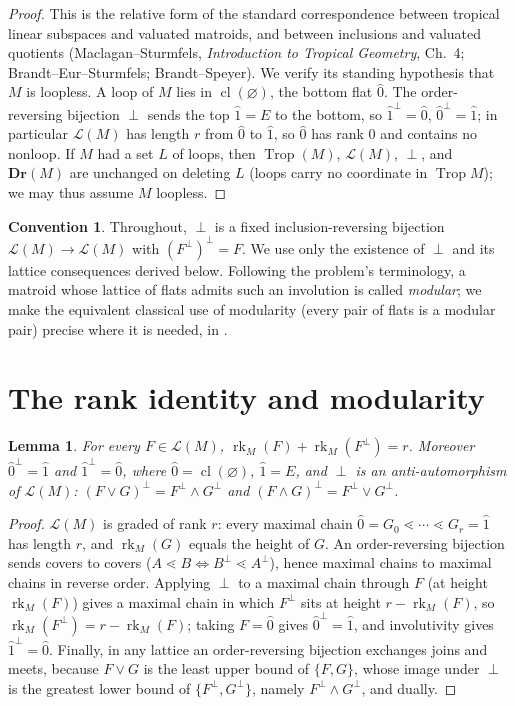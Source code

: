 \documentclass{article}
\newtheorem{lemma}[theorem]{Lemma}
\theoremstyle{definition}
\newtheorem{convention}[theorem]{Convention}
\newcommand{\rk}{\operatorname{rk}}
\newcommand{\cl}{\operatorname{cl}}
\newcommand{\Trop}{\operatorname{Trop}}
\newcommand{\Dr}{\mathbf{Dr}}
\newcommand{\cLL}{\mathcal{L}}
\begin{document}
\begin{proof}
This is the relative form of the standard correspondence between tropical linear subspaces and
valuated matroids, and between inclusions and valuated quotients (Maclagan--Sturmfels,
\emph{Introduction to Tropical Geometry}, Ch.~4; Brandt--Eur--Sturmfels; Brandt--Speyer). We verify
its standing hypothesis that $M$ is loopless. A loop of $M$ lies in $\cl(\varnothing)$, the bottom
flat $\hat0$. The order-reversing bijection $\perp$ sends the top $\hat1=E$ to the bottom, so
$\hat1^{\perp}=\hat0$, $\hat0^{\perp}=\hat1$; in particular $\cLL(M)$ has length $r$ from $\hat0$ to
$\hat1$, so $\hat0$ has rank $0$ and contains no nonloop. If $M$ had a set $L$ of loops, then
$\Trop(M)$, $\cLL(M)$, $\perp$, and $\Dr(M)$ are unchanged on deleting $L$ (loops carry no coordinate
in $\Trop M$); we may thus assume $M$ loopless.
\end{proof}

\begin{convention}\label{conv:perp}
Throughout, $\perp$ is a fixed inclusion-reversing bijection $\cLL(M)\to\cLL(M)$ with
$(F^{\perp})^{\perp}=F$. We use only the existence of $\perp$ and its lattice consequences derived
below. Following the problem's terminology, a matroid whose lattice of flats admits such an
involution is called \emph{modular}; we make the equivalent classical use of modularity (every pair
of flats is a modular pair) precise where it is needed, in .
\end{convention}

\section{The rank identity and modularity}

\begin{lemma}\label{lem:rank}
For every $F\in\cLL(M)$, $\rk_M(F)+\rk_M(F^{\perp})=r$. Moreover $\hat0^{\perp}=\hat1$ and
$\hat1^{\perp}=\hat0$, where $\hat0=\cl(\varnothing)$, $\hat1=E$, and $\perp$ is an anti-automorphism
of $\cLL(M)$: $(F\vee G)^{\perp}=F^{\perp}\wedge G^{\perp}$ and $(F\wedge G)^{\perp}=F^{\perp}\vee
G^{\perp}$.
\end{lemma}

\begin{proof}
$\cLL(M)$ is graded of rank $r$: every maximal chain $\hat0=G_0\lessdot\cdots\lessdot G_r=\hat1$ has
length $r$, and $\rk_M(G)$ equals the height of $G$. An order-reversing bijection sends covers to
covers ($A\lessdot B\iff B^{\perp}\lessdot A^{\perp}$), hence maximal chains to maximal chains in
reverse order. Applying $\perp$ to a maximal chain through $F$ (at height $\rk_M(F)$) gives a maximal
chain in which $F^{\perp}$ sits at height $r-\rk_M(F)$, so $\rk_M(F^{\perp})=r-\rk_M(F)$; taking
$F=\hat0$ gives $\hat0^{\perp}=\hat1$, and involutivity gives $\hat1^{\perp}=\hat0$. Finally, in any
lattice an order-reversing bijection exchanges joins and meets, because $F\vee G$ is the least upper
bound of $\{F,G\}$, whose image under $\perp$ is the greatest lower bound of $\{F^{\perp},G^{\perp}\}$,
namely $F^{\perp}\wedge G^{\perp}$, and dually.
\end{proof}
\end{document}
